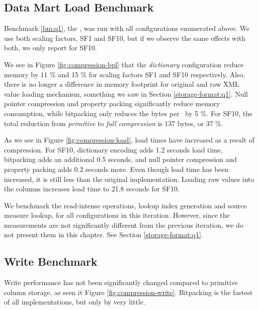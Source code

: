 \subsection{Data Mart Load Benchmark}
\label{compression:q1}
Benchmark \ref{bm:q1}, the \tpchdl, was run with all configurations enumerated above. We use both scaling factors, SF1 and SF10, but if we observe the same effects with both, we only report for SF10.

We see in Figure \ref{fig:compression-bpl} that the \textit{dictionary} configuration reduce memory by 11 \% and 15 \% for scaling factors SF1 and SF10 respectively. Also, there is no longer a difference in memory footprint for original and raw XML value loading mechanism, something we saw in Section \ref{storage-format:q1}. Null pointer compression and property packing significantly reduce memory consumption, while bitpacking only reduces the bytes per \lineitem~by 5 \%. For SF10, the total reduction from \textit{primitive} to \textit{full compression} is 137 bytes, or 37 \%.

As we see in Figure \ref{fig:compression-load}, load times have increased as a result of compression. For SF10, dictionary encoding adds 1.2 seconds load time, bitpacking adds an additional 0.5 seconds, and null pointer compression and property packing adds 0.2 seconds more. Even though load time has been increased, it is still less than the original implementation. Loading raw values into the columns increases load time to 21.8 seconds for SF10.

We benchmark the read-intense operations, lookup index generation and source measure lookup, for all configurations in this iteration. However, since the measurements are not significantly different from the previous iteration, we do not present them in this chapter. See Section \ref{storage-format:q1}.

\subsection{Write Benchmark}
\label{compression:write}
Write performance has not been significantly changed compared to primitive column storage, as seen it Figure \ref{fig:compression-write}. Bitpacking is the fastest of all implementations, but only by very little.

